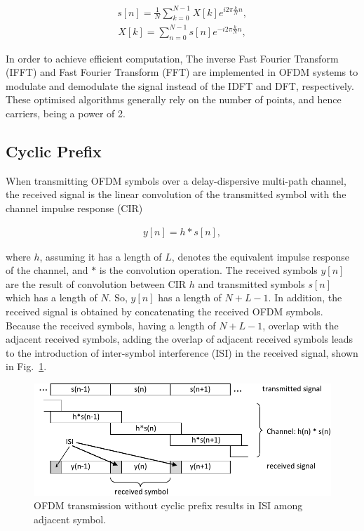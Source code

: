 \begin{eqnarray}
\label{equ:sampledOFDMsignal}
s[n] = \frac{1}{N}\sum_{k=0}^{N-1} X[k] e^{i2\pi\frac{k}{N}n},
\end{eqnarray}
\begin{eqnarray}
\label{equ:sampledOFDMsignal}
X[k] = \sum_{n=0}^{N-1} s[n] e^{-i2\pi\frac{k}{N}n},
\end{eqnarray}

In order to achieve efficient computation, The inverse Fast Fourier Transform (IFFT) and Fast Fourier Transform (FFT) are implemented in OFDM systems to modulate and demodulate the signal instead of the IDFT and DFT, respectively. These optimised algorithms generally rely on the number of points, and hence carriers, being a power of 2.

\subsection{Cyclic Prefix}

When transmitting OFDM symbols over a delay-dispersive multi-path channel, the received signal is the linear convolution of the transmitted symbol with the channel impulse response (CIR)

\begin{eqnarray}
\label{equ:sampledOFDMsignal}
y[n] = h*s[n],
\end{eqnarray}

where $h$, assuming it has a length of $L$, denotes the equivalent impulse response of the channel, and $*$ is the convolution operation.
The received symbols $y[n]$ are the result of convolution between CIR $h$ and transmitted symbols $s[n]$ which has a length of $N$.
So, $y[n]$ has a length of $N+L-1$.
In addition, the received signal is obtained by concatenating the received OFDM symbols.
Because the received symbols, having a length of $N+L-1$, overlap with the adjacent received symbols, adding the overlap of adjacent received symbols leads to the introduction of inter-symbol interference (ISI) in the received signal, shown in Fig.~\ref{fig:CIR-noCP}.


\begin{figure}
	\centerline{\includegraphics [width=0.8\columnwidth] {Figures/CIR_noCP.pdf} }
	\caption{OFDM transmission without cyclic prefix results in ISI among adjacent symbol.}
	\label{fig:CIR-noCP}
\end{figure}

